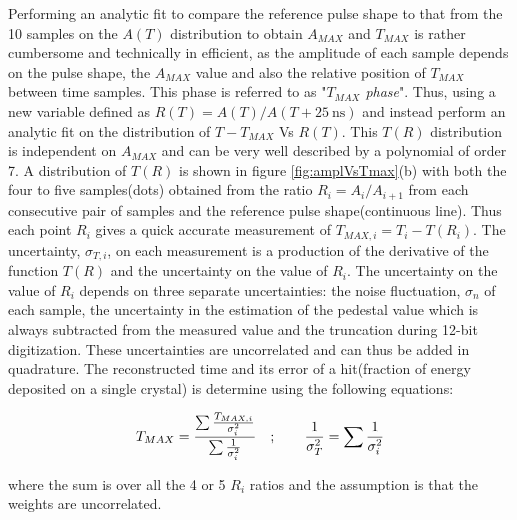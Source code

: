 Performing an analytic fit to compare the reference pulse shape to that from the 10 samples on the $A(T)$ distribution to obtain $A_{MAX}$ and $T_{MAX}$ is rather cumbersome and technically in efficient, as the amplitude of each sample depends on the pulse shape, the $A_{MAX}$ value and also the relative position of $T_{MAX}$ between time samples. This phase is referred to as "\textit{$T_{MAX}$ phase}".
Thus, using a new variable defined as $R(T) = A(T)/ A(T + 25~\mbox{ns})$ and instead perform an analytic fit on the distribution of $T - T_{MAX}$ Vs $ R(T)$. This  $T(R)$ distribution is independent on $A_{MAX}$ and can be very well described by a polynomial of order 7. A distribution of $T(R)$ is shown in figure \ref{fig:amplVsTmax}(b) with both the four to five samples(dots) obtained from the ratio $R_{i} = A_{i}/A_{i+1}$ from each consecutive pair of samples and the reference pulse shape(continuous line). Thus each point $R_{i}$ gives a quick accurate measurement of $T_{MAX,i} = T_{i} - T(R_{i})$. The uncertainty, $\sigma_{T,i}$, on each measurement is a production of the derivative of the function $T(R)$ and the uncertainty on the value of $R_{i}$. The uncertainty on the value of $R_{i}$ depends on three separate uncertainties: the noise fluctuation, $\sigma_{n}$ of each sample, the uncertainty in the estimation of the pedestal value which is always subtracted from the measured value and the truncation during 12-bit digitization. These uncertainties are uncorrelated and can thus be added in quadrature.
The reconstructed time and its error of a hit(fraction of energy deposited on a single crystal) is determine using the following equations:


\begin{equation}{\label{eq:TMAX}}
\displaystyle{T_{MAX} = \frac{\sum \frac{T_{MAX,i}}{\sigma^{2}_{i}}}{\sum \frac{1}{\sigma^{2}_{i}}}} \quad ; \quad\quad
\displaystyle{\frac{1}{\sigma^{2}_{T}} =  \sum \frac{1}{\sigma^{2}_{i}} }
\end{equation}

where the sum is over all the 4 or 5 $R_{i}$ ratios and the assumption is that the weights are uncorrelated. 

